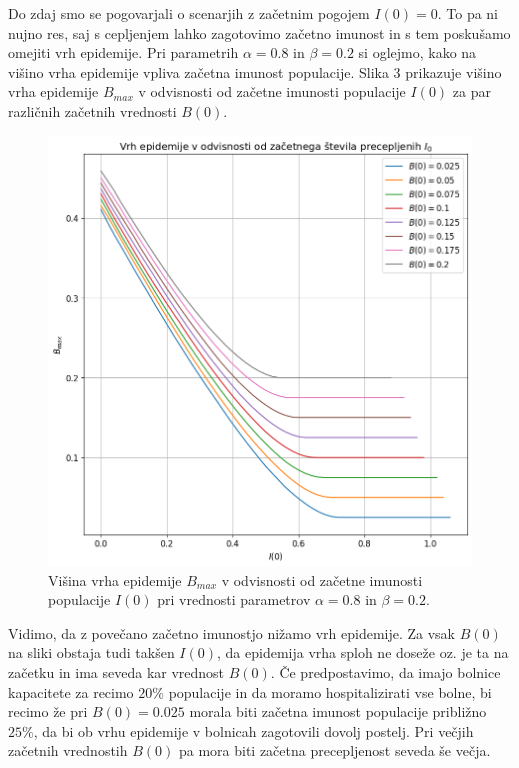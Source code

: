 \documentclass[slovene,11pt,a4paper]{article}
\begin{document}
\newpage

Do zdaj smo se pogovarjali o scenarjih z začetnim pogojem $I(0) = 0$. To pa ni nujno res, saj s cepljenjem lahko zagotovimo začetno imunost in s tem poskušamo omejiti vrh epidemije. Pri parametrih $\alpha = 0.8$ in $\beta = 0.2$ si oglejmo, kako na višino vrha epidemije vpliva začetna imunost populacije. Slika 3 prikazuje višino vrha epidemije $B_{max}$ v odvisnosti od začetne imunosti populacije $I(0)$ za par različnih začetnih vrednosti $B(0)$.

\begin{figure}[h!]
\centering
\includegraphics[width=13.5cm]{zacetni3.png}
\caption{Višina vrha epidemije $B_{max}$ v odvisnosti od začetne imunosti populacije $I(0)$ pri vrednosti parametrov $\alpha = 0.8$ in $\beta = 0.2$.}
\end{figure}

Vidimo, da z povečano začetno imunostjo nižamo vrh epidemije. Za vsak $B(0)$ na sliki obstaja tudi takšen $I(0)$, da epidemija vrha sploh ne doseže oz. je ta na začetku in ima seveda kar vrednost $B(0)$. Če predpostavimo, da imajo bolnice kapacitete za recimo $20\%$ populacije in da moramo hospitalizirati vse bolne, bi recimo že pri $B(0) = 0.025$ morala biti začetna imunost populacije približno $25\%$, da bi ob vrhu epidemije v bolnicah zagotovili dovolj postelj. Pri večjih začetnih vrednostih $B(0)$ pa mora biti začetna precepljenost seveda še večja.
\end{document}
